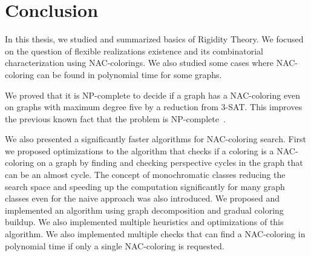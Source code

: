 
\chapter*{Conclusion}



In this thesis,
we studied and summarized basics of Rigidity Theory.
We focused on the question of flexible realizations existence
and its combinatorial characterization using NAC-colorings.
We also studied some cases where NAC-coloring can be found in polynomial time
for some graphs.

We proved that it is NP-complete
to decide if a graph has a NAC-coloring even on graphs with maximum degree five
by a reduction from 3-SAT\@.
This improves the previous known fact that the problem is NP-complete~\cite{np_complete}.

We also presented a significantly faster algorithms
for NAC-coloring search.
%
First we proposed optimizations to the algorithm
that checks if a coloring is a NAC-coloring on a graph
by finding and checking perspective cycles in the graph
that can be an almost cycle.
%
The concept of monochromatic classes reducing the search space
and speeding up the computation significantly for many graph classes
even for the naive approach was also introduced.
%
We proposed and implemented an algorithm using graph decomposition and gradual coloring buildup.
We also implemented multiple heuristics and optimizations of this algorithm.
%
We also implemented multiple checks that can find a NAC-coloring in polynomial time
if only a single NAC-coloring is requested.

